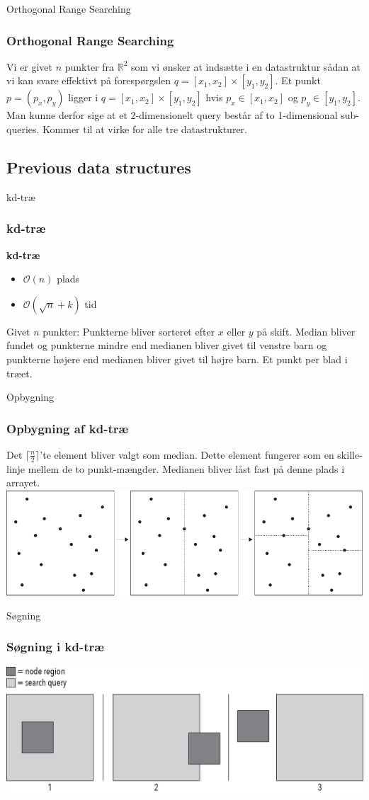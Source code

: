 \documentclass[pdf]{beamer}
\begin{document}
\begin{frame}{Orthogonal Range Searching}
  \frametitle{Orthogonal Range Searching}

  Vi er givet $n$ punkter fra $\mathbb{R}^2$ som vi ønsker at indsætte i en datastruktur sådan at vi kan svare effektivt på forespørgslen $q = [x_1, x_2] \times [y_1, y_2]$.
  Et punkt $p = (p_x, p_y)$ ligger i $q = [x_1, x_2] \times [y_1, y_2]$ hvis $p_x \in [x_1, x_2]$ og $p_y \in [y_1, y_2]$. Man kunne derfor sige at et 2-dimensionelt query består af to 1-dimensional sub-queries. Kommer til at virke for alle tre datastrukturer.
\end{frame}

\subsection{Previous data structures}

\begin{frame}{kd-træ}
  \frametitle{kd-træ}
  \textbf{kd-træ}
  \begin{itemize}
    \item $\mathcal{O}(n)$ plads
    \item $\mathcal{O}(\sqrt{n} + k)$ tid
  \end{itemize}
  Givet $n$ punkter: Punkterne bliver sorteret efter $x$ eller $y$ på skift. Median bliver fundet og punkterne mindre end medianen bliver givet til venstre barn og punkterne højere end medianen bliver givet til højre barn. Et punkt per blad i træet.
\end{frame}

\begin{frame}{Opbygning}
  \frametitle{Opbygning af kd-træ}
  Det $\lceil \frac{n}{2} \rceil$'te element bliver valgt som median. Dette element fungerer som en skille-linje mellem de to punkt-mængder. Medianen bliver låst fast på denne plads i arrayet.
  \includegraphics[scale=0.75]{pictures/kd_subdivision-eps-converted-to.pdf}
\end{frame}


\begin{frame}{Søgning}
  \frametitle{Søgning i kd-træ}
  \begin{center}
    \includegraphics[scale=0.75]{pictures/search_query_overlap.png}
  \end{center}
\end{frame}
\end{document}
